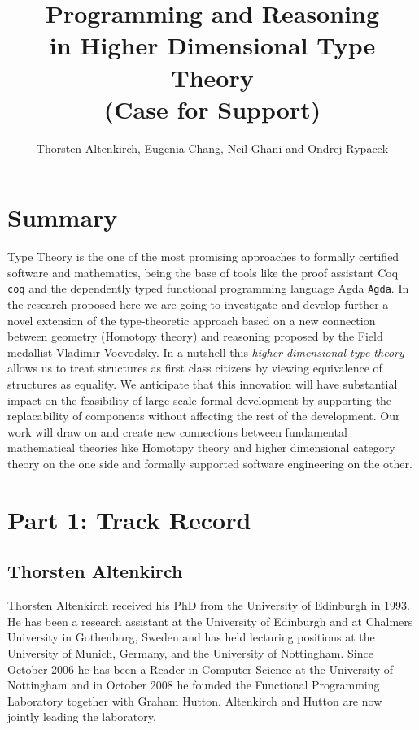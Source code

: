 \documentclass[a4paper]{article}
\title{Programming and Reasoning\\ in Higher Dimensional Type Theory \\
\LARGE (Case for Support)}
\author{Thorsten Altenkirch, Eugenia Chang, Neil Ghani and Ondrej Rypacek}
\date{}
\renewcommand{\cite}[1]{{\tt #1}}
\begin{document}
\maketitle
\section*{Summary}
Type Theory is the one of the most promising approaches to formally
certified software and mathematics, being the base of tools like the
proof assistant Coq \cite{coq} and the dependently typed functional
programming language Agda \cite{Agda}. In the research proposed here
we are going to investigate and develop further a novel extension of
the type-theoretic approach based on a new connection between geometry
(Homotopy theory) and reasoning proposed by the Field medallist Vladimir
Voevodsky. In a nutshell this \emph{higher dimensional type theory}
allows us to treat structures as first class citizens by viewing
equivalence of structures as equality. We anticipate that this
innovation will have substantial impact on the feasibility of large scale
formal development by supporting the replacability of components
without affecting the rest of the development. Our work will draw on
and create new connections between fundamental mathematical theories
like Homotopy theory and higher dimensional category theory on the one
side and formally supported software engineering on the other.


\section*{Part 1: Track Record}

\subsection*{Thorsten Altenkirch}
Thorsten Altenkirch received his PhD from the University of
Edinburgh in 1993. He has been a research assistant at the University of
Edinburgh and at Chalmers University in Gothenburg, Sweden and has
held lecturing positions at the University of Munich, Germany, and the
University of Nottingham. Since October 2006 he has been a Reader in
Computer Science at the University of Nottingham and in October
2008 he founded the Functional Programming Laboratory together with
Graham Hutton. Altenkirch and Hutton are now jointly leading the
laboratory.
\end{document}

